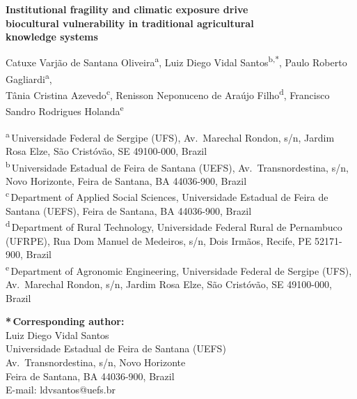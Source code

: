 \documentclass[12pt]{article}
\begin{document}
\begin{center}

{\LARGE\bfseries Institutional fragility and climatic exposure drive\\[4pt]
biocultural vulnerability in traditional agricultural\\[4pt]
knowledge systems}

\vspace{24pt}

{\large
Catuxe Varj\~ao de Santana Oliveira\textsuperscript{a},\quad
Luiz Diego Vidal Santos\textsuperscript{b,*},\quad
Paulo Roberto Gagliardi\textsuperscript{a},\\[6pt]
T\^ania Cristina Azevedo\textsuperscript{c},\quad
Renisson Neponuceno de Ara\'ujo Filho\textsuperscript{d},\quad
Francisco Sandro Rodrigues Holanda\textsuperscript{e}
}

\vspace{18pt}

\end{center}

\noindent
\textsuperscript{a}\,Universidade Federal de Sergipe (UFS), Av.\ Marechal Rondon, s/n, Jardim Rosa Elze, S\~ao Crist\'ov\~ao, SE 49100-000, Brazil\\[4pt]
\textsuperscript{b}\,Universidade Estadual de Feira de Santana (UEFS), Av.\ Transnordestina, s/n, Novo Horizonte, Feira de Santana, BA 44036-900, Brazil\\[4pt]
\textsuperscript{c}\,Department of Applied Social Sciences, Universidade Estadual de Feira de Santana (UEFS), Feira de Santana, BA 44036-900, Brazil\\[4pt]
\textsuperscript{d}\,Department of Rural Technology, Universidade Federal Rural de Pernambuco (UFRPE), Rua Dom Manuel de Medeiros, s/n, Dois Irm\~aos, Recife, PE 52171-900, Brazil\\[4pt]
\textsuperscript{e}\,Department of Agronomic Engineering, Universidade Federal de Sergipe (UFS), Av.\ Marechal Rondon, s/n, Jardim Rosa Elze, S\~ao Crist\'ov\~ao, SE 49100-000, Brazil

\vspace{18pt}

\noindent
\textbf{*\,Corresponding author:}\\
Luiz Diego Vidal Santos\\
Universidade Estadual de Feira de Santana (UEFS)\\
Av.\ Transnordestina, s/n, Novo Horizonte\\
Feira de Santana, BA 44036-900, Brazil\\
E-mail: ldvsantos@uefs.br
\end{document}
